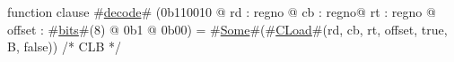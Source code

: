 function clause #\hyperref[zdecode]{decode}# (0b110010 @ rd : regno @ cb : regno@ rt : regno @ offset : #\hyperref[zbits]{bits}#(8) @ 0b1 @ 0b00) = #\hyperref[zSome]{Some}#(#\hyperref[zCLoad]{CLoad}#(rd, cb, rt, offset, true,  B, false)) /* CLB */
